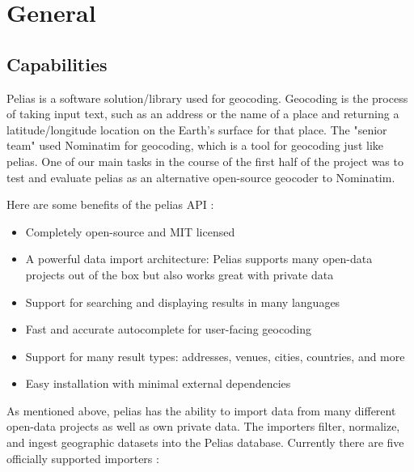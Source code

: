 

\section{General}
\subsection{Capabilities}
Pelias is a software solution/library used for geocoding. Geocoding is the process of taking input text, such as an address or the name of a place and returning a latitude/longitude location on the Earth's surface for that place.
The "senior team" used Nominatim for geocoding, which is a tool for geocoding just like pelias. One of our main tasks  in the course of the first half of the project was to test and evaluate pelias as an alternative open-source geocoder to Nominatim.

Here are some benefits of the pelias API \cite{Simoni2018}:
\begin{itemize}
\item Completely open-source and MIT licensed
\item A powerful data import architecture: Pelias supports many open-data projects out of the box but also works great with private data
\item Support for searching and displaying results in many languages
\item Fast and accurate autocomplete for user-facing geocoding
\item Support for many result types: addresses, venues, cities, countries, and more
\item Easy installation with minimal external dependencies
\end{itemize}

As mentioned above, pelias has the ability to import data from many different open-data projects as well as own private data. The importers filter, normalize, and ingest geographic datasets into the Pelias database. Currently there are five officially supported importers \cite{Simoni2018}:

